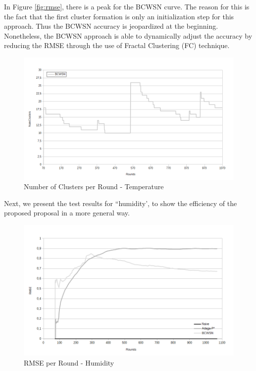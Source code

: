 \documentclass{acm_proc_article-sp}
\begin{document}
In Figure \ref{fig:rmse}, there is a peak for the BCWSN curve. The reason for
this is the fact that the first cluster formation is only an initialization step
for this approach. Thus the BCWSN accuracy is jeopardized at the beginning.
Nonetheless, the BCWSN approach is able to dynamically adjust the accuracy by
reducing the RMSE through the use of Fractal Clustering (FC) technique.
\begin{figure}[!htb]
\begin{center}
	\includegraphics[scale=0.34]{BCWSN-NumClustersxRound-PB.png}
	 \vspace*{-.6cm}
    \caption{Number of Clusters per Round - Temperature}
    \label{fig:num-clts}
\end{center}
\end{figure}

Next, we present the test results for ``humidity', to show the efficiency of the
proposed proposal in a more general way.

\begin{figure}[!htb]
\begin{center}
	\includegraphics[scale=0.37]{BCWSN-RMSExRound-PB-Hum.png}
	 \vspace*{-.6cm}
    \caption{RMSE per Round - Humidity}
    \label{fig:rmse-hum}
\end{center}
\end{figure}
\vspace*{-.3cm}
\end{document}

